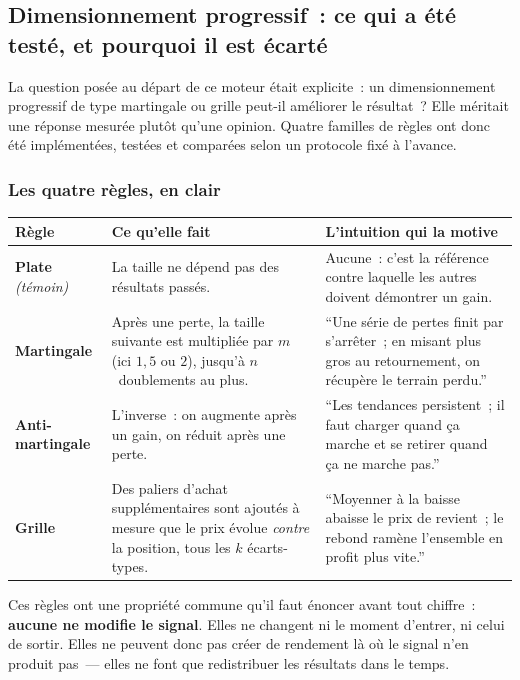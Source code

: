 \subsection{Dimensionnement progressif~: ce qui a été testé, et pourquoi il est écarté}
\label{sec:gold_sizing}

La question posée au départ de ce moteur était explicite~: un dimensionnement progressif de type martingale ou grille peut-il améliorer le résultat~? Elle méritait une réponse mesurée plutôt qu'une opinion. Quatre familles de règles ont donc été implémentées, testées et comparées selon un protocole fixé à l'avance.

\subsubsection*{Les quatre règles, en clair}

\begin{center}
\renewcommand{\arraystretch}{1.35}
\setlength{\tabcolsep}{5pt}
\small
\begin{tabular}{>{\raggedright\arraybackslash}p{2.9cm}>{\raggedright\arraybackslash}p{5.4cm}>{\raggedright\arraybackslash}p{6.1cm}}
\toprule
\textbf{Règle} & \textbf{Ce qu'elle fait} & \textbf{L'intuition qui la motive} \\
\midrule
\textbf{Plate} \emph{(témoin)} & La taille ne dépend pas des résultats passés. & Aucune~: c'est la référence contre laquelle les autres doivent démontrer un gain. \\
\textbf{Martingale} & Après une perte, la taille suivante est multipliée par $m$ (ici $1{,}5$ ou $2$), jusqu'à $n$~doublements au plus. & \enquote{Une série de pertes finit par s'arrêter~; en misant plus gros au retournement, on récupère le terrain perdu.} \\
\textbf{Anti-martingale} & L'inverse~: on augmente après un gain, on réduit après une perte. & \enquote{Les tendances persistent~; il faut charger quand ça marche et se retirer quand ça ne marche pas.} \\
\textbf{Grille} & Des paliers d'achat supplémentaires sont ajoutés à mesure que le prix évolue \emph{contre} la position, tous les $k$ écarts-types. & \enquote{Moyenner à la baisse abaisse le prix de revient~; le rebond ramène l'ensemble en profit plus vite.} \\
\bottomrule
\end{tabular}
\end{center}

Ces règles ont une propriété commune qu'il faut énoncer avant tout chiffre~: \textbf{aucune ne modifie le signal}. Elles ne changent ni le moment d'entrer, ni celui de sortir. Elles ne peuvent donc pas créer de rendement là où le signal n'en produit pas~--- elles ne font que redistribuer les résultats dans le temps.

